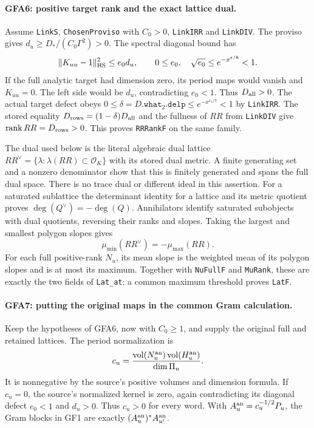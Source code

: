 \paragraph{GFA6: positive target rank and the exact lattice dual.}
\label{claim:GFA6}
Assume \texttt{LinkS}, \texttt{ChosenProviso} with $C_0>0$,
\texttt{LinkIRR} and \texttt{LinkDIV}.  The proviso gives
$d_u\ge D_*/(C_0\Gamma^2)>0$.  The spectral diagonal bound has
\[
 \|K_{uu}-1\|_{\rm HS}^2\le e_0d_u,
 \qquad 0\le e_0,\quad\sqrt{e_0}\le e^{-x^{\epsilon/8}}<1.
\]
If the full analytic target had dimension zero, its period maps
would vanish and $K_{uu}=0$.  The left side would be $d_u$,
contradicting $e_0<1$.  Thus $D_{\rm all}>0$.
The actual target defect obeys
$0\le\delta=D.\texttt{what}_2.\texttt{delp}
 \le e^{-x^{e_z/7}}<1$ by \texttt{LinkIRR}.
The stored equality $D_{\rm rows}=(1-\delta)D_{\rm all}$ and
the fullness of $RR$ from \texttt{LinkDIV} give
$\operatorname{rank}RR=D_{\rm rows}>0$.
This proves \texttt{RRRankF} on the same family.

The dual used below is the literal algebraic dual lattice
$RR^\vee=\{\lambda:\lambda(RR)\subset\mathcal O_K\}$ with its
stored dual metric.  A finite generating set and a nonzero
denominator show that this is finitely generated and spans the
full dual space.  There is no trace dual or different ideal in
this assertion.  For a saturated sublattice the determinant
identity for a lattice and its metric quotient proves
$\deg(Q^\vee)=-\deg(Q)$.  Annihilators identify saturated
subobjects with dual quotients, reversing their ranks and
slopes.  Taking the largest and smallest polygon slopes gives
\[
 \mu_{\min}(RR^\vee)=-\mu_{\max}(RR).
\]
For each full positive-rank $N_u$, its mean slope is the weighted
mean of its polygon slopes and is at most its maximum.
Together with \texttt{NuFullF} and \texttt{MuRank}, these are
exactly the two fields of \texttt{Lat\_at}; a common maximum
threshold proves \texttt{LatF}.

\paragraph{GFA7: putting the original maps in the common Gram calculation.}
\label{claim:GFA7}
Keep the hypotheses of GFA6, now with $C_0\ge1$, and supply
the original full and retained lattices.  The period normalization is
\[
 c_u=\frac{\operatorname{vol}(N_u^{\rm an})
                   \operatorname{vol}(H_u^{\rm an})}{\dim\Pi_u}.
\]
It is nonnegative by the source's positive volumes and dimension
formula.  If $c_u=0$, the source's normalized kernel is zero,
again contradicting its diagonal defect $e_0<1$ and $d_u>0$.
Thus $c_u>0$ for every word.  With $A_u^{\rm an}=c_u^{-1/2}P_u$,
the Gram blocks in GF1 are exactly
$(A_u^{\rm an})^*A_{u'}^{\rm an}$.

